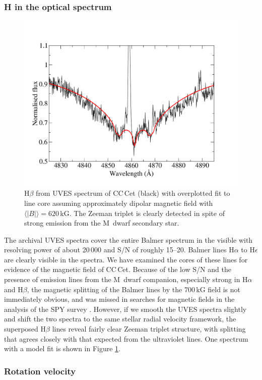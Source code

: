 \documentclass[fleqn,usenatbib]{mnras}
\newcommand{\bs}{\ensuremath{\langle \vert B \vert \rangle}}
\begin{document}
\subsubsection{H in the optical spectrum}
\label{sec:hlines}
\begin{figure}
    \centering
    \includegraphics[width=9 cm]{hbeta_obs_fit.pdf}
    \caption{H$\beta$ from UVES spectrum of CC\,Cet (black) with overplotted fit to line core assuming approximately dipolar magnetic field with $\bs = 620$\,kG. The Zeeman triplet is clearly detected in spite of strong emission from the M~dwarf secondary star.}
    \label{fig:hbeta_obs_fit}
\end{figure}

The archival UVES spectra cover the entire Balmer spectrum in the visible with resolving power of about 20\,000 and S/N of roughly 15--20. Balmer lines H$\alpha$ to H$\epsilon$ are clearly visible in the spectra. We have examined the cores of these lines for evidence of the magnetic field of CC\,Cet. Because of the low S/N and the presence of emission lines from the M~dwarf companion, especially strong in H$\alpha$ and H$\beta$, the magnetic splitting of the Balmer lines by the 700\,kG field is not immediately obvious, and was missed in searches for magnetic fields in the analysis of the SPY survey \citep{napiwotzkietal20-1, koesteretal09-2}. However, if we smooth the UVES spectra slightly and shift the two spectra to the same stellar radial velocity framework, the superposed H$\beta$ lines reveal fairly clear Zeeman triplet structure, with splitting that agrees closely with that expected from the ultraviolet lines. One spectrum with a model fit is shown in Figure \ref{fig:hbeta_obs_fit}.

\subsubsection{Rotation velocity}
\label{sec:rotation}
\end{document}
